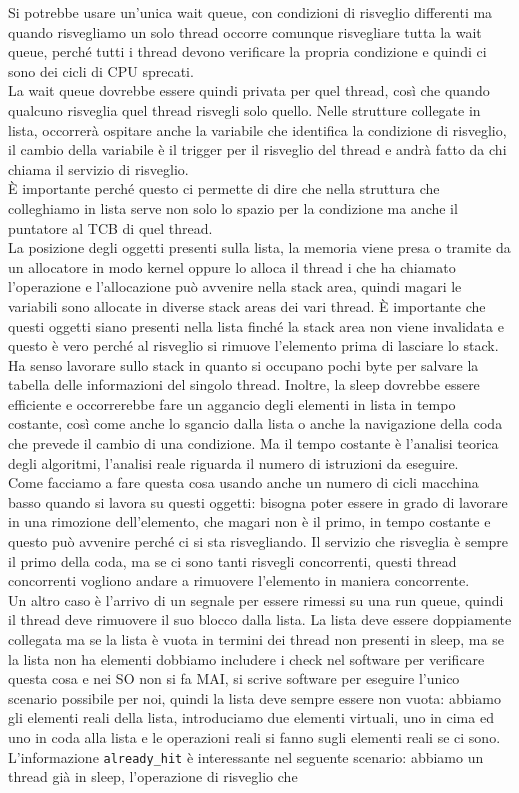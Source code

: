 \documentclass[12pt, oneside]{extbook}
\begin{document}
Si potrebbe usare un'unica wait queue, con condizioni di risveglio differenti ma quando risvegliamo un solo thread occorre comunque risvegliare tutta la wait queue, perché tutti i thread devono verificare la propria condizione e quindi ci sono dei cicli di CPU sprecati.\\La wait queue dovrebbe essere quindi privata per quel thread, così che quando qualcuno risveglia quel thread risvegli solo quello. Nelle strutture collegate in lista, occorrerà ospitare anche la variabile che identifica la condizione di risveglio, il cambio della variabile è il trigger per il risveglio del thread e andrà fatto da chi chiama il servizio di risveglio.\\È importante perché questo ci permette di dire che nella struttura che colleghiamo in lista serve non solo lo spazio per la condizione ma anche il puntatore al TCB di quel thread.\\La posizione degli oggetti presenti sulla lista, la memoria viene presa o tramite da un allocatore in modo kernel oppure lo alloca il thread i che ha chiamato l'operazione e l'allocazione può avvenire nella stack area, quindi magari le variabili sono allocate in diverse stack areas dei vari thread. È importante che questi oggetti siano presenti nella lista finché la stack area non viene invalidata e questo è vero perché al risveglio si rimuove l'elemento prima di lasciare lo stack. Ha senso lavorare sullo stack in quanto si occupano pochi byte per salvare la tabella delle informazioni del singolo thread. Inoltre, la sleep dovrebbe essere efficiente e occorrerebbe fare un aggancio degli elementi in lista in tempo costante, così come anche lo sgancio dalla lista o anche la navigazione della coda che prevede il cambio di una condizione. Ma il tempo costante è l'analisi teorica degli algoritmi, l'analisi reale riguarda il numero di istruzioni da eseguire.\\Come facciamo a fare questa cosa usando anche un numero di cicli macchina basso quando si lavora su questi oggetti: bisogna poter essere in grado di lavorare in una rimozione dell'elemento, che magari non è il primo, in tempo costante e questo può avvenire perché ci si sta risvegliando. Il servizio che risveglia è sempre il primo della coda, ma se ci sono tanti risvegli concorrenti, questi thread concorrenti vogliono andare a rimuovere l'elemento in maniera concorrente.\\Un altro caso è l'arrivo di un segnale per essere rimessi su una run queue, quindi il thread deve rimuovere il suo blocco dalla lista. La lista deve essere doppiamente collegata ma se la lista è vuota in termini dei thread non presenti in sleep, ma se la lista non ha elementi dobbiamo includere i check nel software per verificare questa cosa e nei SO non si fa MAI, si scrive software per eseguire l'unico scenario possibile per noi, quindi la lista deve sempre essere non vuota: abbiamo gli elementi reali della lista, introduciamo due elementi virtuali, uno in cima ed uno in coda alla lista e le operazioni reali si fanno sugli elementi reali se ci sono.\\L'informazione \texttt{already\_hit} è interessante nel seguente scenario: abbiamo un thread già in sleep, l'operazione di risveglio che 
\end{document}
